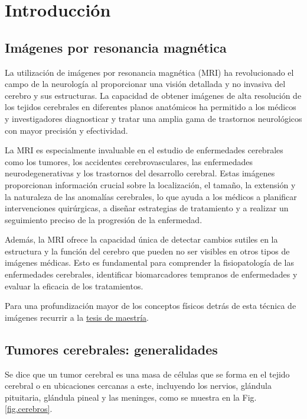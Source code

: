 
\chapter{Introducción}


\section{Imágenes por resonancia magnética}

La utilización de imágenes por resonancia magnética (MRI) ha revolucionado el campo de la neurología al proporcionar una visión detallada y no invasiva del cerebro y sus estructuras. La capacidad de obtener imágenes de alta resolución de los tejidos cerebrales en diferentes planos anatómicos ha permitido a los médicos y investigadores diagnosticar y tratar una amplia gama de trastornos neurológicos con mayor precisión y efectividad. 

La MRI es especialmente invaluable en el estudio de enfermedades cerebrales como los tumores, los accidentes cerebrovasculares, las enfermedades neurodegenerativas y los trastornos del desarrollo cerebral. Estas imágenes proporcionan información crucial sobre la localización, el tamaño, la extensión y la naturaleza de las anomalías cerebrales, lo que ayuda a los médicos a planificar intervenciones quirúrgicas, a diseñar estrategias de tratamiento y a realizar un seguimiento preciso de la progresión de la enfermedad.

Además, la MRI ofrece la capacidad única de detectar cambios sutiles en la estructura y la función del cerebro que pueden no ser visibles en otros tipos de imágenes médicas. Esto es fundamental para comprender la fisiopatología de las enfermedades cerebrales, identificar biomarcadores tempranos de enfermedades y evaluar la eficacia de los tratamientos.

Para una profundización mayor de los conceptos físicos detrás de esta técnica de imágenes recurrir a la \href{https://ricabib.cab.cnea.gov.ar/774/}{tesis de maestría}.

\section{Tumores cerebrales: generalidades}

Se dice que un tumor cerebral es una masa de células que se forma en el tejido cerebral o en ubicaciones cercanas a este, incluyendo los nervios, glándula pituitaria, glándula pineal y las meninges, como se muestra en la Fig. \ref{fig.cerebros}.


